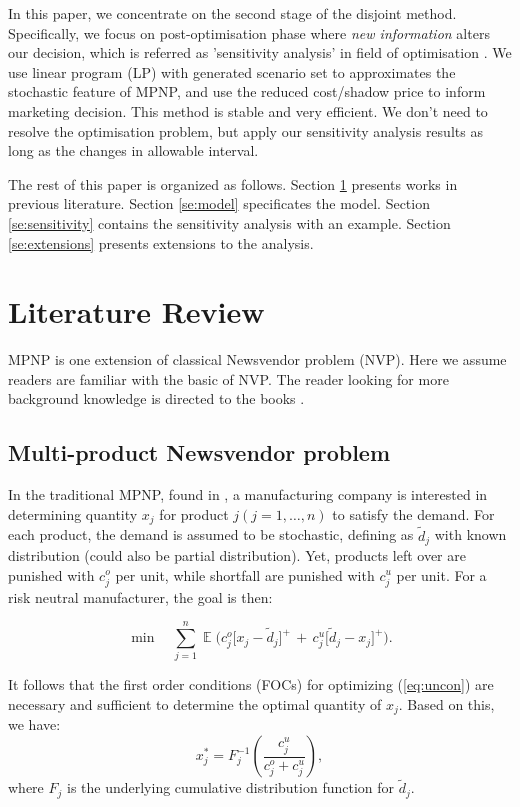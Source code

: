 \documentclass[a4paper,11pt]{article}
\begin{document}
In this paper, we concentrate on the second stage of the disjoint method. Specifically, we focus on post-optimisation phase where \emph{new information} alters our decision, which is referred as 'sensitivity analysis' in field of optimisation \cite{D98,Ga03,Va20}. We use linear program (LP) with generated scenario set to approximates the stochastic feature of MPNP, and use the reduced cost/shadow price to inform marketing decision. This method is stable and very efficient. We don't need to resolve the optimisation problem, but apply our sensitivity analysis results as long as the changes in allowable interval.

The rest of this paper is organized as follows. Section \ref{se:lit} presents works in previous literature. Section \ref{se:model} specificates the model. Section \ref{se:sensitivity} contains the sensitivity analysis with an example. Section \ref{se:extensions} presents extensions to the analysis.
\section{Literature Review}
\label{se:lit}
MPNP is one extension of classical Newsvendor problem (NVP). Here we assume readers are familiar with the basic of NVP. The reader looking for more background knowledge is directed to the books \cite{Ch12,Po02,SPP98}.

\subsection{Multi-product Newsvendor problem}
\label{sub:lit_mpnp}
In the traditional MPNP, found in \cite{HW63,NS84}, a manufacturing company is interested in determining quantity $x_j$ for product $j (j=1,\dots,n)$ to satisfy the demand. For each product, the demand is assumed to be stochastic, defining as ${\tilde d}_j$ with known distribution (could also be partial distribution). Yet, products left over are punished with $c_j^o$ per unit, while shortfall are punished with $c_j^u$ per unit. For a risk neutral manufacturer, the goal is then:

\begin{equation}
    \min \quad \sum_{j=1}^n \mathop{\mathbb{E}} \big( c^o_j \big[  x_j - {\tilde d}_j \big]^+ \, + \, c^u_j \big[ {\tilde d}_j - x_j \big]^+ \big).
\label{eq:uncon}
\end{equation}

It follows that the first order conditions (FOCs) for optimizing (\ref{eq:uncon}) are
necessary and sufficient to determine the optimal quantity of $x_j$. Based on this, we have:
\[
    x_j^* = F_j^{-1}\left( \frac{c_j^u}{c_j^o+c_j^u} \right),
\]
where $F_j$ is the underlying cumulative distribution function for ${\tilde d}_j$.
\end{document}
